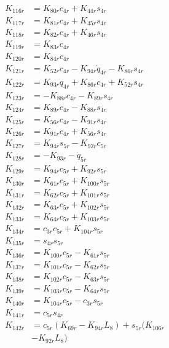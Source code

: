 \begin{multicols}{2}
\begin{align}
K_{116r} &= K_{80r}c_{4r} + K_{44r}s_{4r} \nonumber \\
K_{117r} &= K_{81r}c_{4r} + K_{45r}s_{4r} \nonumber \\
K_{118r} &= K_{82r}c_{4r} + K_{46r}s_{4r} \nonumber \\
K_{119r} &= K_{83r}c_{4r} \nonumber \\
K_{120r} &= K_{84r}c_{4r} \nonumber \\
K_{121r} &= K_{52r}c_{4r} - K_{94r}\dot{q}_{4r} - K_{86r}s_{4r} \nonumber \\
K_{122r} &= K_{93r}\dot{q}_{4r} + K_{86r}c_{4r} + K_{52r}s_{4r} \nonumber \\
K_{123r} &= - K_{88r}c_{4r} - K_{89r}s_{4r} \nonumber \\
K_{124r} &= K_{89r}c_{4r} - K_{88r}s_{4r} \nonumber \\
K_{125r} &= K_{56r}c_{4r} - K_{91r}s_{4r} \nonumber \\
K_{126r} &= K_{91r}c_{4r} + K_{56r}s_{4r} \nonumber \\
K_{127r} &= K_{94r}s_{5r} - K_{92r}c_{5r} \nonumber \\
K_{128r} &= - K_{93r} - \dot{q}_{5r} \nonumber \\
K_{129r} &= K_{94r}c_{5r} + K_{92r}s_{5r} \nonumber \\
K_{130r} &= K_{61r}c_{5r} + K_{100r}s_{5r} \nonumber \\
K_{131r} &= K_{62r}c_{5r} + K_{101r}s_{5r} \nonumber \\
K_{132r} &= K_{63r}c_{5r} + K_{102r}s_{5r} \nonumber \\
K_{133r} &= K_{64r}c_{5r} + K_{103r}s_{5r} \nonumber \\
K_{134r} &= c_{3r}c_{5r} + K_{104r}s_{5r} \nonumber \\
K_{135r} &= s_{4r}s_{5r} \nonumber \\
K_{136r} &= K_{100r}c_{5r} - K_{61r}s_{5r} \nonumber \\
K_{137r} &= K_{101r}c_{5r} - K_{62r}s_{5r} \nonumber \\
K_{138r} &= K_{102r}c_{5r} - K_{63r}s_{5r} \nonumber \\
K_{139r} &= K_{103r}c_{5r} - K_{64r}s_{5r} \nonumber \\
K_{140r} &= K_{104r}c_{5r} - c_{3r}s_{5r} \nonumber \\
K_{141r} &= c_{5r}s_{4r} \nonumber \\
K_{142r} &= c_{5r}(K_{69r} - K_{94r}L_8) + s_{5r}(K_{106r}  \nonumber \\
&- K_{92r}L_8) \nonumber \\

\end{align}
\end{multicols}
